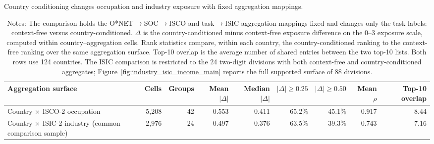 \begin{table}[!htbp]
\centering
\footnotesize
\setlength{\tabcolsep}{2pt}
\caption{Country conditioning changes occupation and industry exposure with fixed aggregation mappings.}
\label{tab:appendix_country_conditioning_isco_isic}
\begin{tabular}{p{}rrrrrrrr}
\toprule
Aggregation surface & Cells & Groups & Mean $|\Delta|$ & Median $|\Delta|$ & $|\Delta|\geq0.25$ & $|\Delta|\geq0.50$ & Mean $\rho$ & Top-10 overlap \\
\midrule
Country $\times$ ISCO-2 occupation & 5,208 & 42 & 0.553 & 0.411 & 65.2\% & 45.1\% & 0.917 & 8.44 \\
Country $\times$ ISIC-2 industry (common comparison sample) & 2,976 & 24 & 0.497 & 0.376 & 63.5\% & 39.3\% & 0.743 & 7.16 \\
\bottomrule
\end{tabular}
\caption*{\scriptsize Notes: The comparison holds the O*NET$\rightarrow$SOC$\rightarrow$ISCO and task$\rightarrow$ISIC aggregation mappings fixed and changes only the task labels: context-free versus country-conditioned. $\Delta$ is the country-conditioned minus context-free exposure difference on the 0--3 exposure scale, computed within country--aggregation cells. Rank statistics compare, within each country, the country-conditioned ranking to the context-free ranking over the same aggregation surface. Top-10 overlap is the average number of shared entries between the two top-10 lists. Both rows use 124 countries. The ISIC comparison is restricted to the 24 two-digit divisions with both context-free and country-conditioned aggregates; Figure~\ref{fig:industry_isic_income_main} reports the full supported surface of 88 divisions.}
\end{table}
